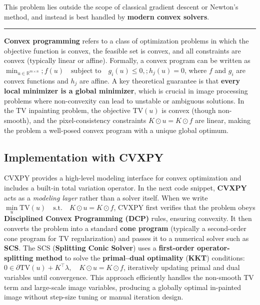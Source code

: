 \documentclass[11pt]{article}
\begin{document}
This problem lies outside the scope of classical gradient descent or
Newton's method, and instead is best handled by \textbf{modern convex
solvers}.

\begin{center}\rule{0.5\linewidth}{0.5pt}\end{center}

\textbf{Convex programming} refers to a class of optimization problems
in which the objective function is convex, the feasible set is convex,
and all constraints are convex (typically linear or affine). Formally, a
convex program can be written as
\(\min_{u \in \mathbb{R}^{m \times n}} ; f(u) \quad \text{subject to} \quad g_i(u) \le 0,; h_j(u)=0\),
where \(f\) and \(g_i\) are convex functions and \(h_j\) are affine. A
key theoretical guarantee is that \textbf{every local minimizer is a
global minimizer}, which is crucial in image processing problems where
non-convexity can lead to unstable or ambiguous solutions. In the TV
inpainting problem, the objective \(\mathrm{TV}(u)\) is convex (though
non-smooth), and the pixel-consistency constraints
\(K \odot u = K \odot f\) are linear, making the problem a well-posed
convex program with a unique global optimum.

\hypertarget{implementation-with-cvxpy}{%
\subsection{\texorpdfstring{\textbf{Implementation with
CVXPY}}{Implementation with CVXPY}}\label{implementation-with-cvxpy}}

CVXPY provides a high-level modeling interface for convex optimization
and includes a built-in total variation operator. In the next code
snippet, \textbf{CVXPY} acts as a \emph{modeling layer} rather than a
solver itself. When we write
\(\underset{u}{\min} \mathrm{TV}(u) \quad \text{s.t.} \quad K \odot u = K \odot f\),
CVXPY first verifies that the problem obeys \textbf{Disciplined Convex
Programming (DCP)} rules, ensuring convexity. It then converts the
problem into a standard \textbf{cone program} (typically a second-order
cone program for TV regularization) and passes it to a numerical solver
such as \textbf{SCS}. The SCS (\textbf{Splitting Conic Solver}) uses a
\textbf{first-order operator-splitting method} to solve the
\textbf{primal--dual optimality} (\textbf{KKT}) conditions:
\(0 \in \partial \mathrm{TV}(u) + K^\top \lambda, \quad K \odot u = K \odot f\),
iteratively updating primal and dual variables until convergence. This
approach efficiently handles the non-smooth TV term and large-scale
image variables, producing a globally optimal in-painted image without
step-size tuning or manual iteration design.
\end{document}
